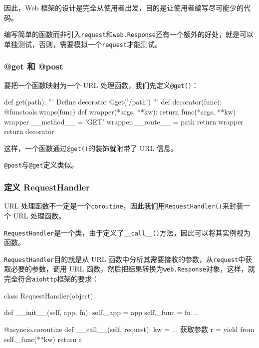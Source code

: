 因此，Web
框架的设计是完全从使用者出发，目的是让使用者编写尽可能少的代码。

编写简单的函数而非引入\texttt{request}和\texttt{web.Response}还有一个额外的好处，就是可以单独测试，否则，需要模拟一个\texttt{request}才能测试。

\hypertarget{get-ux548c-post}{%
\subsubsection{@get 和 @post}\label{get-ux548c-post}}

要把一个函数映射为一个 URL 处理函数，我们先定义\texttt{@get()}：

\begin{pythoncode}
def get(path):
    '''
    Define decorator @get('/path')
    '''
    def decorator(func):
        @functools.wraps(func)
        def wrapper(*args, **kw):
            return func(*args, **kw)
        wrapper.__method__ = 'GET'
        wrapper.__route__ = path
        return wrapper
    return decorator
\end{pythoncode}

这样，一个函数通过\texttt{@get()}的装饰就附带了 URL 信息。

\texttt{@post}与\texttt{@get}定义类似。

\hypertarget{ux5b9aux4e49-requesthandler}{%
\subsubsection{定义 RequestHandler}\label{ux5b9aux4e49-requesthandler}}

URL
处理函数不一定是一个\texttt{coroutine}，因此我们用\texttt{RequestHandler()}来封装一个
URL 处理函数。

\texttt{RequestHandler}是一个类，由于定义了\texttt{\_\_call\_\_()}方法，因此可以将其实例视为函数。

\texttt{RequestHandler}目的就是从 URL
函数中分析其需要接收的参数，从\texttt{request}中获取必要的参数，调用 URL
函数，然后把结果转换为\texttt{web.Response}对象，这样，就完全符合\texttt{aiohttp}框架的要求：

\begin{pythoncode}
class RequestHandler(object):

    def __init__(self, app, fn):
        self._app = app
        self._func = fn
        ...

    @asyncio.coroutine
    def __call__(self, request):
        kw = ... 获取参数
        r = yield from self._func(**kw)
        return r
\end{pythoncode}

